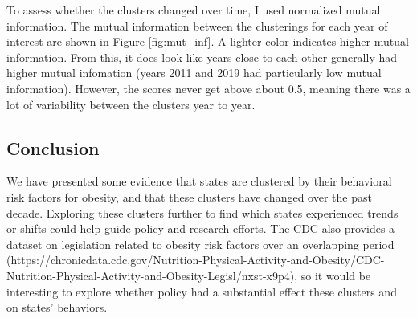 \documentclass[11pt]{article}
\begin{document}
To assess whether the clusters changed over time, I used normalized mutual information. The mutual information between the clusterings for each year of interest are shown in Figure \ref{fig:mut_inf}. A lighter color indicates higher mutual information. From this, it does look like years close to each other generally had higher mutual infomation (years 2011 and 2019 had particularly low mutual information). However, the scores never get above about 0.5, meaning there was a lot of variability between the clusters year to year. 


\subsection{Conclusion}
We have presented some evidence that states are clustered by their behavioral risk factors for obesity, and that these clusters have changed over the past decade. Exploring these clusters further to find which states experienced trends or shifts could help guide policy and research efforts. The CDC also provides a dataset on legislation related to obesity risk factors over an overlapping period (https://chronicdata.cdc.gov/Nutrition-Physical-Activity-and-Obesity/CDC-Nutrition-Physical-Activity-and-Obesity-Legisl/nxst-x9p4), so it would be interesting to explore whether policy had a substantial effect these clusters and on states' behaviors. 
 
\end{document}

